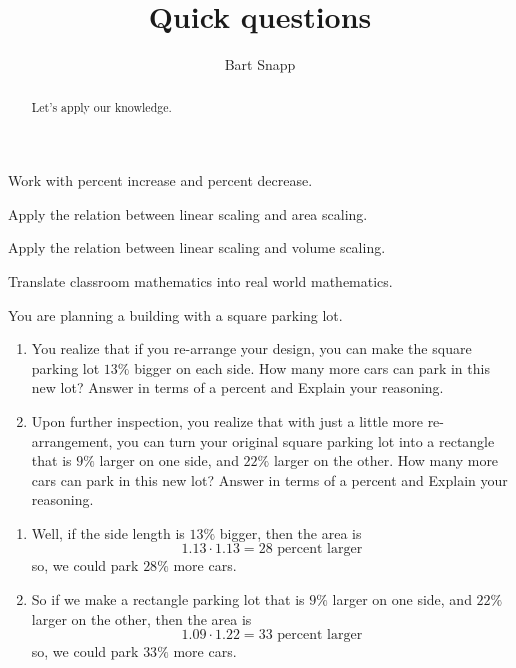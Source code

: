 \documentclass[nooutcomes,noauthor,handout]{ximera}
\title{Quick questions}
\author{Bart Snapp}
\begin{document}
\begin{abstract}
  Let's apply our knowledge.
\end{abstract}
\maketitle


\begin{listOutcomes}
\item Work with percent increase and percent decrease.
\item Apply the relation between linear scaling and area scaling.
\item Apply the relation between linear scaling and volume scaling.
\item Translate classroom mathematics into real world mathematics. 
\end{listOutcomes}

\mynewpage


\begin{question}
  You are planning a building with a square parking lot.
  \begin{enumerate}
  \item You realize that if you re-arrange your design, you can make
    the square parking lot $13\%$ bigger on each side. How many more
    cars can park in this new lot? Answer in terms of a percent and
    Explain your reasoning.
  \item Upon further inspection, you realize that with just a little
    more re-arrangement, you can turn your original square parking lot
    into a rectangle that is $9\%$ larger on one side, and $22\%$
    larger on the other. How many more cars can park in this new lot?
    Answer in terms of a percent and Explain your reasoning.
  \end{enumerate}
  \begin{freeResponse}
    \begin{enumerate}
    \item Well, if the side length is $13\%$ bigger, then the area is
      \[
      1.13\cdot 1.13 = \text{$28$ percent larger}
      \]
      so, we could park $28\%$ more cars.
    \item So if we make a rectangle parking lot that is $9\%$ larger on
      one side, and $22\%$ larger on the other, then the area is
      \[
      1.09\cdot 1.22 = \text{$33$ percent larger}
      \]
      so, we could park $33\%$ more cars.
    \end{enumerate}
  \end{freeResponse}
\end{question}
\mynewpage
\end{document}
